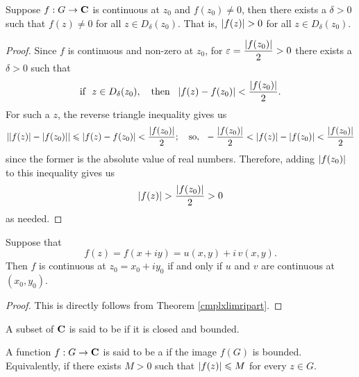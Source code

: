 \begin{theorem}
Suppose $f: G \to \mathbf C$ is continuous at $z_0$ and $f(z_0) \neq 0$, then there exists a $\delta > 0$ such that $f(z) \neq 0$ for all $z \in D_\delta(z_0)$. That is, $\left\lvert f(z)\right\rvert > 0$ for all $z \in D_\delta(z_0)$.
\end{theorem}
\begin{proof}
Since $f$ is continuous and non-zero at $z_0$, for $\varepsilon = \dfrac{\left\lvert f(z_0)\right\rvert}{2} > 0$ there exists a $\delta > 0$ such that
\[\text{if }\ z \in D_\delta(z_0),\quad \text{then }\ \left\lvert f(z) - f(z_0)\right\rvert< \frac{\left\lvert f(z_0)\right\rvert}{2}.\]
For such a $z$, the reverse triangle inequality gives us
\[\abs{\abs{f(z)} - \abs{f(z_0)}} \leq \abs{f(z) - f(z_0)}< \frac{\abs{f(z_0)}}{2};\quad \text{so, }\ -\frac{\abs{f(z_0)}}{2} < \abs{f(z)} - \abs{f(z_0)} < \frac{\abs{f(z_0)}}{2}\]
since the former is the absolute value of real numbers. Therefore, adding $\left\lvert f(z_0)\right\rvert$ to this inequality gives us
\[\left\lvert f(z)\right\rvert > \frac{\left\lvert f(z_0)\right\rvert}{2} > 0\]
as needed.
\end{proof}

\vspace*{1em}

\begin{theorem}\label{contpart}
Suppose that 
\[f(z) = f(x + iy) = u(x,y) + i\,v(x,y).\]
Then $f$ is continuous at $z_0 = x_0 + iy_0$ if and only if $u$ and $v$ are continuous at $(x_0,y_0)$.
\end{theorem}
\begin{proof}
This is directly follows from Theorem \ref{cmplxlimripart}.
\end{proof}

\vspace*{1em}

\begin{definition}
A subset of $\mathbf C$ is said to be  if it is closed and bounded.
\end{definition}

\vspace*{1em}

\begin{definition}
A function $f: G \to \mathbf C$ is said to be a  if the image $f(G)$ is bounded. Equivalently, if there exists $M > 0$ such that $\left\lvert f(z)\right\rvert \leqslant M$ for every $z \in G$.
\end{definition}

\vspace*{1em}


